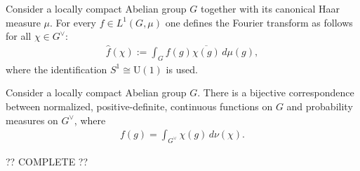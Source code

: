     \begin{construct}
        Consider a locally compact Abelian group $G$ together with its canonical Haar measure $\mu$. For every $f\in L^1(G,\mu)$ one defines the Fourier transform as follows for all $\chi\in G^\vee$:
        \begin{gather}
            \widehat{f}(\chi) := \int_G f(g)\overline{\chi(g)}\,d\mu(g),
        \end{gather}
        where the identification $S^1\cong\mathrm{U}(1)$ is used.
    \end{construct}

    \begin{theorem}[Bochner]
        Consider a locally compact Abelian group $G$. There is a bijective correspondence between normalized, positive-definite, continuous functions on $G$ and probability measures on $G^\vee$, where
        \begin{gather}
            f(g) = \int_{G^\vee}\chi(g)\,d\nu(\chi).
        \end{gather}
    \end{theorem}

    ?? COMPLETE ??